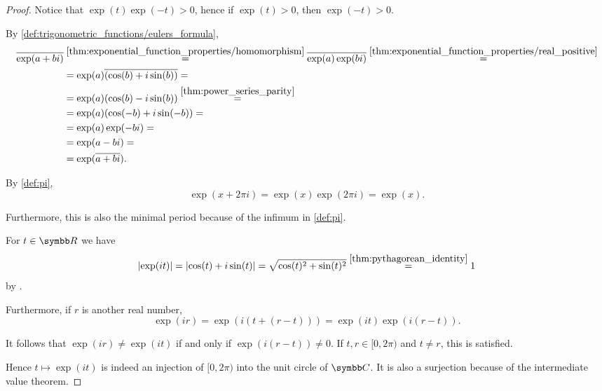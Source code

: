 \begin{proof}
  Notice that \( \exp(t) \exp(-t) > 0 \), hence if \( \exp(t) > 0 \), then \( \exp(-t) > 0 \).

   By \cref{def:trigonometric_functions/eulers_formula},
  \begin{align*}
    \overline{\exp(a + bi)}
    &\overset {\ref{thm:exponential_function_properties/homomorphism}} =
    \overline{\exp(a) \exp(bi)}
    \overset {\ref{thm:exponential_function_properties/real_positive}} = \\ &=
    \exp(a) \overline{(\cos(b) + i\sin(b))}
    = \\ &=
    \exp(a) (\cos(b) - i\sin(b))
    \overset {\ref{thm:power_series_parity}} = \\ &=
    \exp(a) (\cos(-b) + i\sin(-b))
    = \\ &=
    \exp(a) \exp(-bi)
    = \\ &=
    \exp(a - bi)
    = \\ &=
    \exp(\overline{a + bi}).
  \end{align*}

   By \cref{def:pi},
  \begin{equation*}
    \exp(x + 2\pi i) = \exp(x) \exp(2 \pi i) = \exp(x).
  \end{equation*}

  Furthermore, this is also the minimal period because of the infimum in \cref{def:pi}.

   For \( t \in \R \) we have
  \begin{equation*}
    \left\vert \exp(it) \right\vert
    =
    \left\vert \cos(t) + i\sin(t) \right\vert
    =
    \sqrt{\cos(t)^2 + \sin(t)^2}
    \overset {\ref{thm:pythagorean_identity}} =
    1
  \end{equation*}
  by .

  Furthermore, if \( r \) is another real number,
  \begin{equation}
    \exp(ir)
    =
    \exp(i(t + (r - t)))
    =
    \exp(it) \exp(i(r - t)).
  \end{equation}

  It follows that \( \exp(ir) \neq \exp(it) \) if and only if \( \exp(i(r - t)) \neq 0 \). If \( t, r \in [0, 2\pi) \) and \( t \neq r \), this is satisfied.

  Hence \( t \mapsto \exp(it) \) is indeed an injection of \( [0, 2\pi) \) into the unit circle of \( \C \). It is also a surjection because of the intermediate value theorem.


\end{proof}
